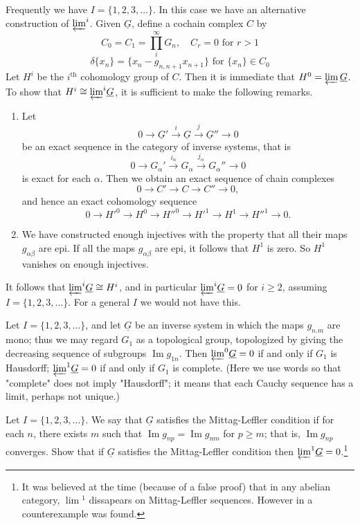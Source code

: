 \documentclass[../main]{subfiles}
\begin{document}
Frequently we have $I=\{1,2,3,...\}$. In this case we have an alternative construction of ${\varprojlim}^i$. Given $\underline{G}$, define a cochain complex $C$ by 
\[C_0=C_1=\prod_i^\infty G_n,\quad C_r=0 \text{ for } r>1 \] 
\[\delta\{x_n\}=\{x_n-g_{n,n+1}x_{n+1}\} \text{ for } \{x_n\}\in C_0\]
Let $H^i$ be the $i^\text{th}$ cohomology group of $C$. Then it is immediate that $H^0=\varprojlim\underline{G}$. To show that $H^i\cong{\varprojlim}^i\underline{G}$, it is sufficient to make the following remarks.
\begin{enumerate}[wide=\parindent]
    \item Let \[0\longrightarrow \underline{G}'\overset{i}{\longrightarrow}\underline{G}\overset{j}{\longrightarrow}\underline{G}''\longrightarrow 0\] be an exact sequence in the category of inverse systems, that is \\ \[0\longrightarrow G_\alpha'\overset{i_\alpha}{\longrightarrow}G_\alpha\overset{j_\alpha}{\longrightarrow}G_\alpha''\longrightarrow 0\] is exact for each $\alpha$. Then we obtain an exact sequence of chain complexes
    \[0\longrightarrow C'\longrightarrow C\longrightarrow C'' \longrightarrow 0,\]
    and hence an exact cohomology sequence
    \[0\longrightarrow {H'}^0\longrightarrow H^0\longrightarrow {H''}^0 \longrightarrow {H'}^1 \longrightarrow H^1 \longrightarrow {H''}^1 \longrightarrow 0.\]
    \item We have constructed enough injectives with the property that all their maps $g_{\alpha\beta}$ are epi. If all the maps $g_{\alpha\beta}$ are epi, it follows that $H^1$ is zero. So $H^1$ vanishes on enough injectives.
\end{enumerate}
\par It follows that ${\varprojlim}^i \underline{G}\cong H^i$, and in particular ${\varprojlim}^i\underline{G}=0$ for $i\geq 2$, assuming $I=\{1,2,3,...\}$. For a general $I$ we would not have this.
\begin{exercise} \label{ex:p3ch08.i}
Let $I=\{1,2,3,...\}$, and let $\underline{G}$ be an inverse system in which the maps $g_{n.m}$ are mono; thus we may regard $G_1$ as a topological group, topologized by giving the decreasing sequence of subgroups $\operatorname{Im}g_{1n}$. Then ${\varprojlim}^0\underline{G}=0$ if and only if $G_1$ is Hausdorff; ${\varprojlim}^1\underline{G}=0$ if and only if $G_1$ is complete. (Here we use words so that "complete" does not imply "Hausdorff"; it means that each Cauchy sequence has a limit, perhaps not unique.)
\end{exercise}
\begin{exercise} \label{ex:p3ch08.ii}
Let $I=\{1,2,3,...\}$. We say that $\underline{G}$ satisfies the Mittag-Leffler condition if for each $n$, there exists $m$ such that $\operatorname{Im}g_{np}=\operatorname{Im}g_{nm}$ for $p\geq m$; that is, $\operatorname{Im}g_{np}$ converges. Show that if $\underline{G}$ satisfies the Mittag-Leffler condition then ${\varprojlim}^1\underline{G}=0$.\footnote{It was believed at the time (because of a false proof) that in any abelian category, $\lim\!^1$ dissapears on Mittag-Leffler sequences. However in \cite{Neeman} a counterexample was found.}
\end{exercise} 
\end{document}
